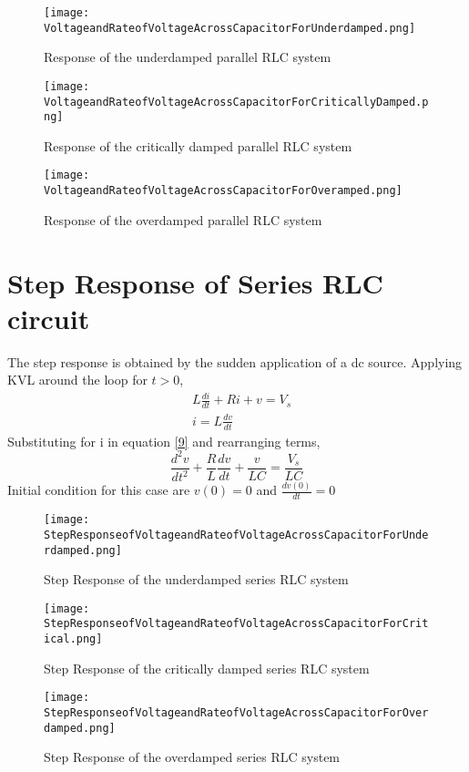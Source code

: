 \documentclass[11pt,a4paper]{article}
\begin{document}
\begin{figure}[H]
\texttt{[image: VoltageandRateofVoltageAcrossCapacitorForUnderdamped.png]}
\caption{Response of the underdamped parallel RLC system }
\centering
\end{figure}

\begin{figure}[H]
\texttt{[image: VoltageandRateofVoltageAcrossCapacitorForCriticallyDamped.png]}
\caption{Response of the critically damped parallel RLC system }
\centering
\end{figure}

\begin{figure}[H]
\texttt{[image: VoltageandRateofVoltageAcrossCapacitorForOveramped.png]}
\caption{Response of the overdamped parallel RLC system }
\centering
\end{figure}

\section{Step Response of Series RLC circuit}
The step response is obtained by the sudden application of a dc source. Applying KVL around the loop for $t>0$,
\begin{align}
 &L\frac{di}{dt} + Ri + v = V_s \label{9} \\
 &i = L\frac{dv}{dt}
\end{align}
 Substituting for i in equation \ref{9}  and rearranging terms,
 $$ \frac{d^2v}{dt^2} + \frac{R}{L}\frac{dv}{dt} + \frac{v}{LC} =  \frac{V_s}{LC} $$
 Initial condition for this case are $v(0) = 0$ and $\frac{dv(0)}{dt} = 0 $

\begin{figure}[H]
\texttt{[image: StepResponseofVoltageandRateofVoltageAcrossCapacitorForUnderdamped.png]}
\caption{Step Response of the underdamped series RLC system }
\centering
\end{figure}

\begin{figure}[H]
\texttt{[image: StepResponseofVoltageandRateofVoltageAcrossCapacitorForCritical.png]}
\caption{Step Response of the critically damped series RLC system }
\centering
\end{figure}

\begin{figure}[H]
\texttt{[image: StepResponseofVoltageandRateofVoltageAcrossCapacitorForOverdamped.png]}
\caption{Step Response of the overdamped series RLC system }
\centering
\end{figure} 
 
\end{document}
